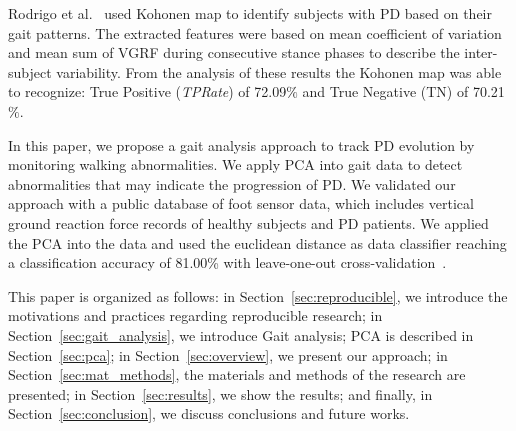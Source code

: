 \documentclass[10pt, conference, compsocconf]{IEEEtran}
\begin{document}
Rodrigo et al.~\cite{rodrigo2012} 
used Kohonen map to identify subjects with PD based on their gait patterns. The extracted features were based on mean coefficient of variation and mean sum of VGRF during consecutive stance phases to describe the inter-subject variability. From the analysis of these results the Kohonen map was able to recognize: True Positive (\textit{TPRate}) of 72.09$\%$ and True Negative (TN) of 70.21$\%$. %

In this paper, we propose a gait analysis approach to track PD evolution by monitoring walking abnormalities. We apply PCA into gait data to detect abnormalities that may indicate the progression of PD. We validated our approach with a public database of foot sensor data, which includes vertical ground reaction force records of healthy subjects and PD patients. We applied the PCA into the data and used the euclidean distance as data classifier reaching a classification accuracy of 81.00\% with leave-one-out cross-validation~\cite{datamining2005}.

This paper is organized as follows: in Section~\ref{sec:reproducible}, we introduce the motivations and practices regarding reproducible research; in Section~\ref{sec:gait_analysis}, we introduce Gait analysis; PCA is described in Section~\ref{sec:pca}; in Section~\ref{sec:overview}, we present our approach; in Section~\ref{sec:mat_methods}, the materials and methods of the research are presented; in Section~\ref{sec:results}, we show the results; and finally, in Section~\ref{sec:conclusion}, we discuss conclusions and future works.
\end{document}
